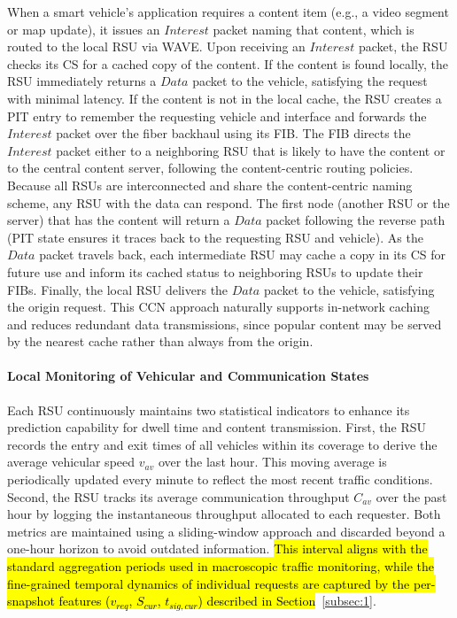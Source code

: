 \documentclass[journal]{IEEEtran}
\begin{document}
When a smart vehicle's application requires a content item (e.g., a video segment or map update), it issues an \(Interest\) packet naming that content, which is routed to the local RSU via WAVE.
Upon receiving an \(Interest\) packet, the RSU checks its CS for a cached copy of the content.
If the content is found locally, the RSU immediately returns a \(Data\) packet to the vehicle, satisfying the request with minimal latency.
If the content is not in the local cache, the RSU creates a PIT entry to remember the requesting vehicle and interface and forwards the \(Interest\) packet over the fiber backhaul using its FIB.
The FIB directs the \(Interest\) packet either to a neighboring RSU that is likely to have the content or to the central content server, following the content-centric routing policies.
Because all RSUs are interconnected and share the content-centric naming scheme, any RSU with the data can respond.
The first node (another RSU or the server) that has the content will return a \(Data\) packet following the reverse path (PIT state ensures it traces back to the requesting RSU and vehicle).
As the \(Data\) packet travels back, each intermediate RSU may cache a copy in its CS for future use and inform its cached status to neighboring RSUs to update their FIBs.
Finally, the local RSU delivers the \(Data\) packet to the vehicle, satisfying the origin request.
This CCN approach naturally supports in-network caching and reduces redundant data transmissions, since popular content may be served by the nearest cache rather than always from the origin.

\paragraph{Local Monitoring of Vehicular and Communication States}
Each RSU continuously maintains two statistical indicators to enhance its prediction capability for dwell time and content transmission.
First, the RSU records the entry and exit times of all vehicles within its coverage to derive the average vehicular speed $v_{av}$ over the last hour.
This moving average is periodically updated every minute to reflect the most recent traffic conditions.
Second, the RSU tracks its average communication throughput $C_{av}$ over the past hour by logging the instantaneous throughput allocated to each requester.
Both metrics are maintained using a sliding-window approach and discarded beyond a one-hour horizon to avoid outdated information.
\hl{This interval aligns with the standard aggregation periods used in macroscopic traffic monitoring, while the fine-grained temporal dynamics of individual requests are captured by the per-snapshot features ($v_{req}$, $S_{cur}$, $t_{sig,cur}$) described in Section}~\ref{subsec:1}.
\end{document}
